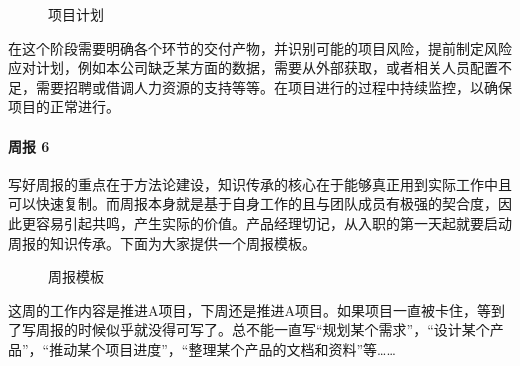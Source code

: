 \documentclass[letterpaper,10pt,english]{sphinxmanual}
\begin{document}
\begin{figure}[H]
\centering
\capstart

\noindent{}
\caption{项目计划}\label{\detokenize{chapter_knowledge/project_manage:id20}}\end{figure}

在这个阶段需要明确各个环节的交付产物，并识别可能的项目风险，提前制定风险应对计划，例如本公司缺乏某方面的数据，需要从外部获取，或者相关人员配置不足，需要招聘或借调人力资源的支持等等。在项目进行的过程中持续监控，以确保项目的正常进行。%
\begin{footnote}[651]\sphinxAtStartFootnote
{}
%
\end{footnote}


\paragraph{周报 6\sphinxfootnotemark[652]}
\label{\detokenize{chapter_knowledge/project_manage:id9}}%
\begin{footnotetext}[652]\sphinxAtStartFootnote
{}
%
\end{footnotetext}\ignorespaces 
写好周报的重点在于方法论建设，知识传承的核心在于能够真正用到实际工作中且可以快速复制。而周报本身就是基于自身工作的且与团队成员有极强的契合度，因此更容易引起共鸣，产生实际的价值。产品经理切记，从入职的第一天起就要启动周报的知识传承。下面为大家提供一个周报模板。

\begin{figure}[H]
\centering
\capstart

\noindent{}
\caption{周报模板}\label{\detokenize{chapter_knowledge/project_manage:id21}}\end{figure}

这周的工作内容是推进A项目，下周还是推进A项目。如果项目一直被卡住，等到了写周报的时候似乎就没得可写了。总不能一直写“规划某个需求”，“设计某个产品”，“推动某个项目进度”，“整理某个产品的文档和资料”等……%
\begin{footnote}[653]\sphinxAtStartFootnote
{}
%
\end{footnote}
\end{document}
